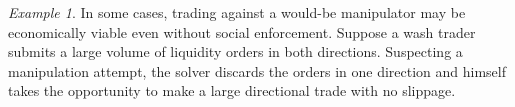 \documentclass[a4paper,10pt]{article}
\theoremstyle{remark}
\newtheorem*{example}{Example}
\begin{document}
\begin{example}
In some cases, trading against a would-be manipulator may be economically viable even without social enforcement.
%
Suppose a wash trader submits a large volume of liquidity orders in both directions.
%
Suspecting a manipulation attempt, the solver discards the orders in one direction and himself takes the opportunity to make a large directional trade with no slippage.
\end{example}

\printbibliography
\end{document}

